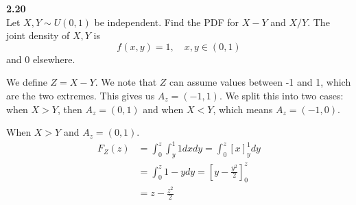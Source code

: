 \newpage\noindent
\textbf{2.20}\\  %
Let $X, Y \sim U(0,1)$ be independent. Find the PDF for $X-Y$ and $X/Y$.
The joint density of $X, Y$ is
$$
f(x, y) = 1,\quad x,y\in(0,1)
$$
and 0 elsewhere.

\medskip\noindent We define $Z = X - Y$. We note that $Z$ can assume values between
-1 and 1, which are the two extremes. This gives us $A_z = (-1, 1)$. We split this
into two cases: when $X > Y$, then $A_z = (0, 1)$ and when $X < Y$, which means $A_z = (-1, 0)$.

When $X > Y$ and $A_z = (0, 1)$.
\begin{align*}
    F_Z(z) &= \int_0^z\int_y^1 1 dxdy = \int_0^z[x]_y^1 dy \\
    &= \int_0^z 1 - y dy = \left[y - \frac{y^2}{2}\right]_0^z \\
    &= z - \frac{z^2}{2} 
\end{align*}


